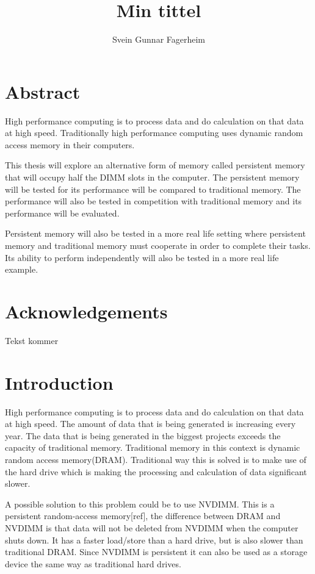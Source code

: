 \documentclass[12pt,a4paper,USenglish]{article}      %
\title{Min tittel}  %
\author{Svein Gunnar Fagerheim}
\begin{document}

\duoforside[dept={Institutt for informatikk}, program={Informatikk: Programming and System Architecture}, long]

\section{Abstract}
High performance computing is to process data and do calculation on that data at high speed. Traditionally high performance computing uses dynamic random access memory in their computers. 

This thesis will explore an alternative form of memory called persistent memory that will occupy half the DIMM slots in the computer. The persistent memory will be tested for its performance will be compared to traditional memory. The performance will also be tested in competition with traditional memory and its performance will be evaluated.

Persistent memory will also be tested in a more real life setting where persistent memory and traditional memory must cooperate in order to complete their tasks. Its ability to perform independently will also be tested in a more real life example. 


\section{Acknowledgements}
Tekst kommer

\tableofcontents

\section{Introduction}
High performance computing is to process data and do calculation on that data at high speed. The amount of data that is being generated is increasing every year. The data that is being generated in the biggest projects exceeds the capacity of traditional memory. Traditional memory in this context is dynamic random access memory(DRAM).
Traditional way this is solved is to make use of the hard drive which is making the processing and calculation of data significant slower.

A possible solution to this problem could be to use NVDIMM. This is a persistent random-access memory[ref], the difference between DRAM and NVDIMM is that data will not be deleted from NVDIMM when the computer shuts down. 
It has a faster load/store than a hard drive, but is also slower than traditional DRAM. Since NVDIMM is persistent it can also be used as a storage device the same way as traditional hard drives.
\end{document}
